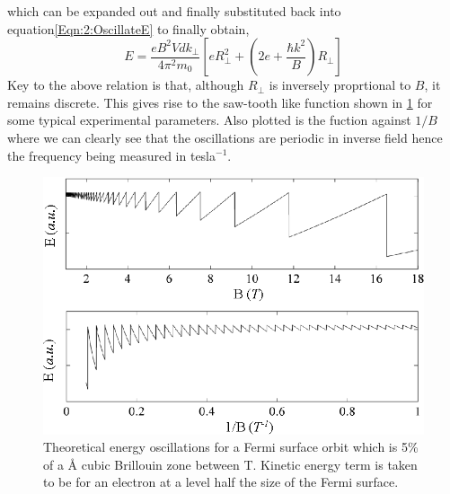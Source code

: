 which can be expanded out and finally substituted back into equation\ref{Eqn:2:OscillateE} to finally obtain,
\begin{equation}
\label{Eqn:2:OscIllustration}
E = \frac{eB^2Vdk_\perp}{4\pi^2m_0}\left[e R_\perp^2 + \left(2e + \frac{\hbar k^2}{B}\right)R_\perp\right]
\end{equation}
Key to the above relation is that, although $R_\perp$ is inversely proprtional to $B$, it remains discrete. This gives rise to the saw-tooth like function shown in \fig\ref{Fig:2:EnergyOscillations} for some typical experimental parameters. Also plotted is the fuction against $1/B$ where we can clearly see that the oscillations are periodic in inverse field hence the frequency being measured in tesla$^{-1}$.
\begin{figure}[htbp]
    \begin{center}
        \includegraphics[scale=0.9]{Chapter2-ExperimentalTechnique/Figures/TheoreticalOscillations/TheoreticalOscillations}
        \caption{Theoretical energy oscillations for a Fermi surface orbit which is 5\% of a \unit[5]{\AA} cubic Brillouin zone between \unit[1--18]{T}. Kinetic energy term is taken to be for an electron at a level half the size of the Fermi surface.}
        \label{Fig:2:EnergyOscillations}
    \end{center}
\end{figure}

